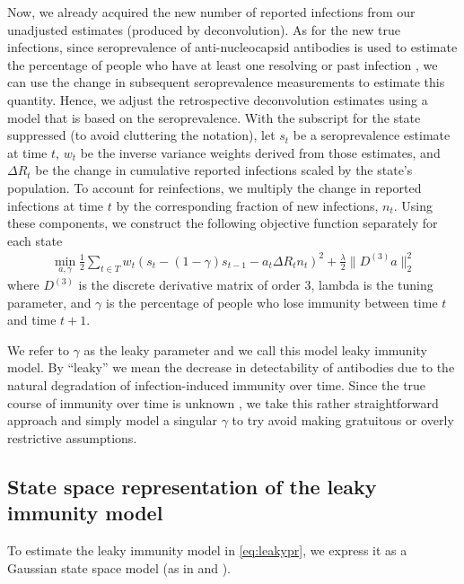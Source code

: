 \documentclass{article}
\begin{document}
Now, we already acquired the new number of reported infections from our
unadjusted estimates (produced by deconvolution). As for the new true
infections, since seroprevalence of anti-nucleocapsid antibodies is used to
estimate the percentage of people who have at least one resolving or past
infection \citep{cdc2020data}, we can use the change in subsequent
seroprevalence measurements to estimate this quantity. Hence, we adjust the 
retrospective deconvolution estimates using a model that is based on the 
seroprevalence. With the subscript for the state suppressed (to avoid 
cluttering the notation), let $s_t$ be a seroprevalence estimate at time $t$, $w_t$ be
 the inverse variance weights derived from those
estimates, and $\Delta R_t$ be the change in cumulative reported infections 
scaled by the state’s population. To account for reinfections, we multiply the 
change in reported infections at time $t$ by the corresponding fraction
 of new infections, $n_t$. Using these components, we construct the 
 following objective function separately for each state
\begin{align}
\min_{a, \gamma}\frac{1}{2}\sum_{t \in T}w_t\left (s_t - (1 -\gamma)s_{t-1} 
- a_t\Delta R_t n_t  \right )^2 + \frac{\lambda}{2} \|D^{(3)}a\|_2^2 \label{eq:leakypr}
\end{align}
where $D^{(3)}$ is the discrete derivative matrix of
order $3$, lambda is the tuning parameter, and $\gamma$ is the percentage of
 people who lose immunity between time $t$ and time $t+1$. 

We refer to $\gamma$ as the leaky parameter and we call this model leaky 
immunity model. By ``leaky'' we mean the decrease in detectability of antibodies 
due to the natural degradation of infection-induced
immunity over time. Since the true course of immunity over time is unknown
\citep{goldberg2022protection}, we take this rather straightforward approach 
and simply model a singular $\gamma$ to try
avoid making gratuitous or overly restrictive assumptions.

\subsection{State space representation of the leaky immunity model}

To estimate the leaky immunity model in \autoref{eq:leakypr}, we express it as a 
Gaussian state space model (as in \citet{durbin2012time} and \citet{helske2017kfas}).
\end{document}
